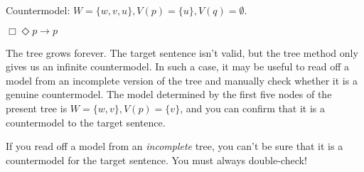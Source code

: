 \begin{solution}
\begin{sollist}

    Countermodel: $W = \{ w,v,u \}, V(p) = \{ u \}, V(q) = \emptyset$.
    
    \medskip
  \item $\Box \Diamond p \to p$
  

  \medskip\noindent The tree grows forever. The target sentence isn't valid, but
  the tree method only gives us an infinite countermodel. In such a case, it may
  be useful to read off a model from an incomplete version of the tree and
  manually check whether it is a genuine countermodel. The model determined by
  the first five nodes of the present tree is $W = \{ w,v \}, V(p)=\{ v \}$,
  and you can confirm that it is a countermodel to the target sentence.

  If you read off a model from an \emph{incomplete} tree, you can't be sure that
  it is a countermodel for the target sentence. You must always double-check!
   
  \end{sollist}
  
\end{solution}

